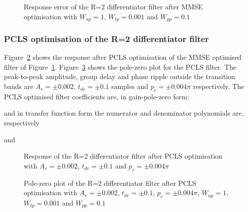 \documentclass[a4paper,twoside,10pt,english]{report}
\begin{document}
\begin{figure}[!htbp]
\begin{center}
\scalebox{0.7}{}
\caption{Response error of the R=2 differentiator filter after MMSE optimisation
with $W_{ap}=1$, $W_{tp}=0.001$ and $W_{pp}=0.1$}
\label{fig:iir-sqp-slb-differentiator-mmse-response}
\end{center}
\end{figure}
\subsubsection{PCLS optimisation of the R=2 differentiator filter}
Figure~\ref{fig:iir-sqp-slb-differentiator-pcls-response} shows the response
after PCLS optimisation of the MMSE optimised filter of
Figure~\ref{fig:iir-sqp-slb-differentiator-mmse-response}.
Figure~\ref{fig:iir-sqp-slb-differentiator-pcls-pz} shows the pole-zero plot
for the PCLS filter. The peak-to-peak amplitude, group delay and phase ripple
outside the transition bands are $A_{r}=\pm 0.002$, $t_{dr}=\pm 0.1$ samples and
$p_{r}=\pm 0.004\pi$ respectively.  The PCLS optimised filter coefficients are,
in gain-pole-zero form:
\begin{small}

\end{small}
and in transfer function form the numerator and denominator polynomials are,
respectively
\begin{small}

\end{small}
and
\begin{small}

\end{small}
\begin{figure}[!htbp]
\begin{center}
\scalebox{0.7}{}
\caption{Response of the R=2 differentiator filter after PCLS optimisation
with $A_{r}=\pm 0.002$, $t_{dr}=\pm 0.1$ and $p_{r}=\pm 0.004\pi$}
\label{fig:iir-sqp-slb-differentiator-pcls-response}
\end{center}
\end{figure}
\begin{figure}[!htbp]
\begin{center}
\scalebox{0.7}{}
\caption{Pole-zero plot of the R=2 differentiator filter after PCLS optimisation
with $A_{r}=\pm 0.002$, $t_{dr}=\pm 0.1$, $p_{r}=\pm 0.004\pi$, $W_{ap}=1$, 
$W_{tp}=0.001$ and $W_{pp}=0.1$}
\label{fig:iir-sqp-slb-differentiator-pcls-pz}
\end{center}
\end{figure}
\end{document}

